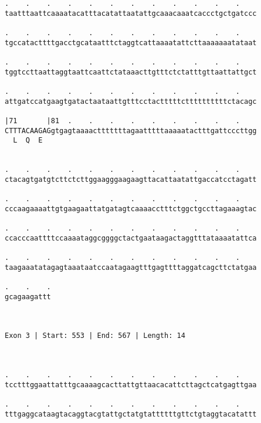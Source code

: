 \documentclass{article}
\begin{document}
\begin{Verbatim}
.    .    .    .    .    .    .    .    .    .    .    .    
taatttaattcaaaatacatttacatattaatattgcaaacaaatcaccctgctgatccc
                                                            
.    .    .    .    .    .    .    .    .    .    .    .    
tgccatacttttgacctgcataatttctaggtcattaaaatattcttaaaaaaatataat
                                                            
.    .    .    .    .    .    .    .    .    .    .    .    
tggtccttaattaggtaattcaattctataaacttgtttctctatttgttaattattgct
                                                            
.    .    .    .    .    .    .    .    .    .    .    .    
attgatccatgaagtgatactaataattgtttcctactttttcttttttttttctacagc
                                                            
|71       |81  .    .    .    .    .    .    .    .    .    
CTTTACAAGAGgtgagtaaaactttttttagaatttttaaaaatactttgattcccttgg
  L  Q  E                                                   
                                                            
  
.    .    .    .    .    .    .    .    .    .    .    .    
ctacagtgatgtcttctcttggaagggaagaagttacattaatattgaccatcctagatt
                                                            
.    .    .    .    .    .    .    .    .    .    .    .    
cccaagaaaattgtgaagaattatgatagtcaaaacctttctggctgccttagaaagtac
                                                            
.    .    .    .    .    .    .    .    .    .    .    .    
ccacccaattttccaaaataggcggggctactgaataagactaggtttataaaatattca
                                                            
.    .    .    .    .    .    .    .    .    .    .    .    
taagaaatatagagtaaataatccaatagaagtttgagttttaggatcagcttctatgaa
                                                            
.    .    .
gcagaagattt
           
           
 
Exon 3 | Start: 553 | End: 567 | Length: 14



.    .    .    .    .    .    .    .    .    .    .    .    
tcctttggaattatttgcaaaagcacttattgttaacacattcttagctcatgagttgaa
                                                            
.    .    .    .    .    .    .    .    .    .    .    .    
tttgaggcataagtacaggtacgtattgctatgtattttttgttctgtaggtacatattt
                                                            

\end{Verbatim}
\end{document}
